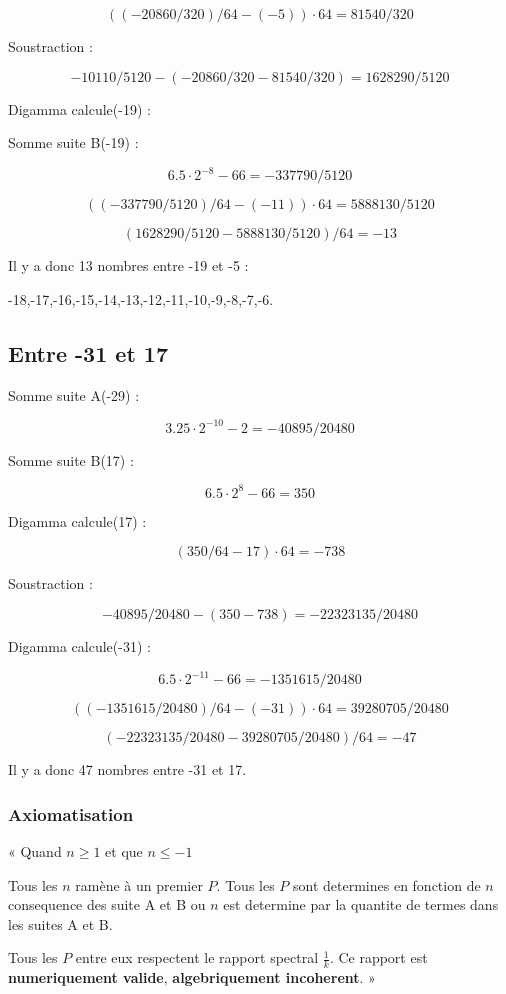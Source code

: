 \documentclass[a4paper,11pt]{article}
\begin{document}
\[
((-20860/320)/64 - (-5)) \cdot 64 = 81540/320
\]

Soustraction :

\[
-10110/5120 - (-20860/320 - 81540/320) = 1628290/5120
\]

Digamma calcule(-19) :

Somme suite B(-19) :

\[
6.5 \cdot 2^{-8} - 66 = -337790/5120
\]

\[
((-337790/5120)/64 - (-11)) \cdot 64 = 5888130/5120
\]

\[
(1628290/5120 - 5888130/5120)/64 = -13
\]

Il y a donc 13 nombres entre -19 et -5 :

-18,-17,-16,-15,-14,-13,-12,-11,-10,-9,-8,-7,-6.

\subsection*{Entre -31 et 17}

Somme suite A(-29) :

\[
3.25 \cdot 2^{-10} - 2 = -40895/20480
\]

Somme suite B(17) :

\[
6.5 \cdot 2^{8} - 66 = 350
\]

Digamma calcule(17) :

\[
(350/64 - 17) \cdot 64 = -738
\]

Soustraction :

\[
-40895/20480 - (350 - 738) = -22323135/20480
\]

Digamma calcule(-31) :

\[
6.5 \cdot 2^{-11} - 66 = -1351615/20480
\]

\[
((-1351615/20480)/64 - (-31)) \cdot 64 = 39280705/20480
\]

\[
(-22323135/20480 - 39280705/20480)/64 = -47
\]

Il y a donc 47 nombres entre -31 et 17.


\subsubsection{Axiomatisation}

\begin{tcolorbox}[colback=blue!5,colframe=holblue,title={\textbf{Axiomatisation du Rapport Spectral}}]
« Quand $n \geq 1$ et que $n \leq -1$

Tous les $n$ ramène à un premier $P$. Tous les $P$ sont determines en fonction de $n$ consequence des suite A et B ou $n$ est determine par la quantite de termes dans les suites A et B.

Tous les $P$ entre eux respectent le rapport spectral $\frac{1}{k}$. Ce rapport est \textbf{numeriquement valide}, \textbf{algebriquement incoherent}. »
\end{tcolorbox}
\end{document}
